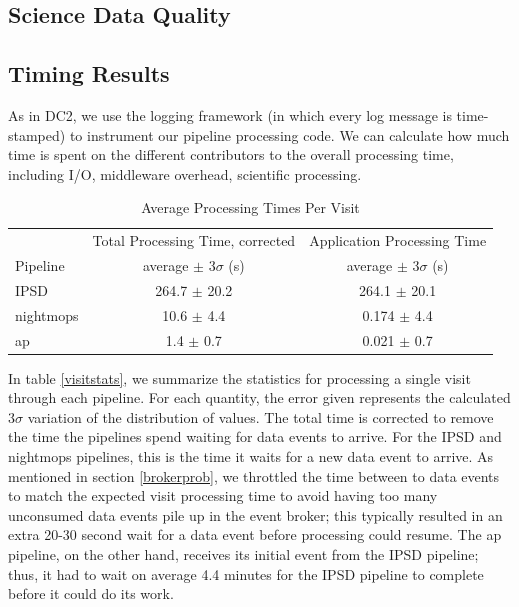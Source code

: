 \subsection{Science Data Quality}

\subsection{Timing Results}
\label{sec:timing}

As in DC2, we use the logging framework (in which every log message is
time-stamped) to instrument our pipeline processing code.  We can
calculate how much time is spent on the different contributors to the
overall processing time, including I/O, middleware overhead,
scientific processing.  

\begin{table}[htbp]
\begin{center}
\caption{Average Processing Times Per Visit
\label{tbl:visitstats}}
\vspace{\baselineskip}
\begin{tabular}{ l | c | c |}
\hline\hline
          & Total Processing Time, corrected
          & Application Processing Time \\ 
Pipeline  & average $\pm$  $3\sigma$ (s) & average $\pm$ $3\sigma$ (s) \\ \hline
IPSD      & 264.7 $\pm$ 20.2 & 264.1 $\pm$ 20.1  \\ 
nightmops & 10.6  $\pm$  4.4 & 0.174 $\pm$  4.4  \\ 
ap        & 1.4   $\pm$  0.7 & 0.021 $\pm$  0.7  \\ \hline
\hline
\end{tabular}

\end{center}
\end{table}


In table \ref{visitstats}, we summarize the statistics for processing
a single visit through each pipeline.  For each quantity, the error
given represents the calculated $3\sigma$ variation of the
distribution of values.  The total time is corrected to remove the
time the pipelines spend waiting for data events to arrive.  For the
IPSD and nightmops pipelines, this is the time it waits for a new data
event to arrive.  As mentioned in section \ref{brokerprob}, we
throttled the time between to data events to match the expected visit
processing time to avoid having too many unconsumed data events pile
up in the event broker; this typically resulted in an extra 20-30
second wait for a data event before processing could resume.  The ap
pipeline, on the other hand, receives its initial event from the IPSD
pipeline; thus, it had to wait on average 4.4 minutes for the IPSD
pipeline to complete before it could do its work.

